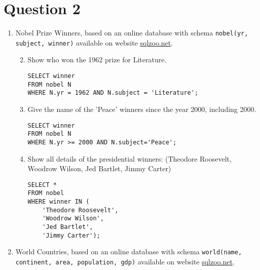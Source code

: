 
\section*{Question 2}

\lstset{language=SQL}
\lstset{numbers=none}
\lstset{tabsize=4}
\lstset{frame=none}

\renewcommand{\labelenumii}{\theenumii}
\renewcommand{\theenumii}{\theenumi.\arabic{enumii}.}
\begin{enumerate}
\item Nobel Prize Winners, based on an online database with schema \texttt{nobel(yr, subject, winner)} available on website \href{http://sqlzoo.net/wiki/SELECT_from_Nobel_Tutorial}{sqlzoo.net}.
\begin{enumerate}
\setcounter{enumii}{1}
\item Show who won the 1962 prize for Literature.
\begin{lstlisting}
SELECT winner
FROM nobel N
WHERE N.yr = 1962 AND N.subject = 'Literature';
\end{lstlisting}
\setcounter{enumii}{3}
\item Give the name of the 'Peace' winners since the year 2000, including 2000.
\begin{lstlisting}
SELECT winner
FROM nobel N
WHERE N.yr >= 2000 AND N.subject='Peace';
\end{lstlisting}
\setcounter{enumii}{5}
\item Show all details of the presidential winners: (Theodore Roosevelt, Woodrow Wilson, Jed Bartlet, Jimmy Carter)
\begin{lstlisting}
SELECT *
FROM nobel
WHERE winner IN (
	'Theodore Roosevelt',
	'Woodrow Wilson',
	'Jed Bartlet',
	'Jimmy Carter');
\end{lstlisting}
\end{enumerate}
\item World Countries, based on an online database with schema \texttt{world(name, continent, area, population, gdp)} available on website \href{http://sqlzoo.net/wiki/SELECT_within_SELECT_Tutorial}{sqlzoo.net}.
\begin{enumerate}

\end{enumerate}
\end{enumerate}

